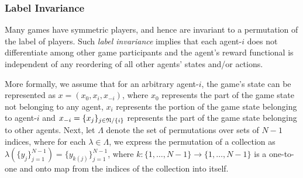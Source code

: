 \documentclass[onefignum,onetabnum]{siamonline171218}
\begin{document}
\subsubsection*{Label Invariance}

Many games have symmetric players, and hence are invariant to a permutation of the label of players. Such \textit{label invariance} implies that each agent-$i$ does not differentiate among other game participants and the agent's reward functional is independent of any reordering of all other agents' states and/or actions.



 


More formally, we assume that for an arbitrary agent-$i$, the game's state can be represented as $x=(x_{0}, x_i, x_{-i} )$, where $x_0$ represents the part of the game state not belonging to any agent, $x_i$ represents the portion of the game state belonging to agent-$i$ and $x_{-i} = \{x_j \}_{j\in {\mathfrak{N}}/\{i\}}$ represents the part of the game state belonging to other agents. Next, let  $\Lambda$ denote the set of permutations over sets of $N-1$ indices, where for each $\lambda\in\Lambda$, we express the permutation of a collection as $\lambda(\{ y_j \}_{j=1}^{N-1}) = \{ y_{k(j)} \}_{j=1}^{N-1}$, where $k:\{1,\dots,N-1\} \rightarrow \{1,\dots,N-1\}$ is a one-to-one and onto map from the indices of the collection into itself.
\end{document}
